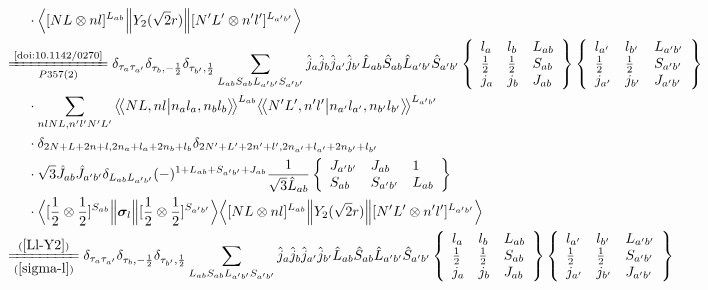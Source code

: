 \documentclass[master]{shnuthesis}
\newcommand{\llangle}{\big\langle\!\big\langle}
\newcommand{\rrangle}{\big\rangle\!\big\rangle}
\newcommand{\ap}{a^\prime}
\newcommand{\bp}{b^\prime}
\newcommand{\il}{\!\!\!\!\!\!\!\!\!\!}
\newcommand{\zdydh}{\xlongequal}
\begin{document}
\begin{align}
    & \cdot \Big\langle [N L \otimes n l]^{L_{ab}} \Big\| Y_2(\sqrt{2}r) \Big\| [N^\prime L^\prime \otimes n^\prime l^\prime]^{L_{\ap\bp}} \Big\rangle \\
    &\il \zdydh[P357(2)]{\text{\cite{doi:10.1142/0270}}} \delta_{\tau_a \tau_{\ap}}\delta_{\tau_b, -\frac{1}{2}}\delta_{\tau_{\bp}, \frac{1}{2}} \sum_{L_{ab}S_{ab}L_{\ap\bp}S_{\ap\bp}} \hat{j}_a\hat{j}_b\hat{j}_{\ap}\hat{j}_{\bp}\hat{L}_{ab}\hat{S}_{ab}\hat{L}_{\ap\bp}\hat{S}_{\ap\bp}  \left\{\begin{array}{lll}l_{a} & l_{b} & L_{ab} \\ \frac{1}{2} & \frac{1}{2} & S_{ab} \\j_{a} & j_{b} & J_{ab} \end{array}\right\} \left\{\begin{array}{lll}l_{\ap} & l_{\bp} & L_{\ap\bp} \\ \frac{1}{2} & \frac{1}{2} & S_{\ap\bp} \\j_{\ap} & j_{\bp} & J_{\ap\bp} \end{array}\right\}  \notag \\
    & \cdot \sum_{nlNL,n^\prime l^\prime N^\prime L^\prime} \llangle N L, n l \big| n_{a} l_{a}, n_{b} l_{b} \rrangle^{L_{ab}} \llangle N^\prime L^\prime, n^\prime l^\prime \big| n_{a^\prime} l_{a^\prime}, n_{b^\prime} l_{b^\prime} \rrangle^{L_{\ap\bp}} \notag\\
    & \cdot \delta_{2N+L+2n+l,2n_a+l_a+2n_b+l_b}\delta_{2N^\prime+L^\prime+2n^\prime+l^\prime,2n_{a^\prime}+l_{a^\prime}+2n_{b^\prime}+l_{b^\prime}}  \notag\\
    & \cdot \sqrt{3}\hat{J}_{ab}\hat{J}_{\ap\bp} \delta_{L_{ab}L_{\ap\bp}}(-)^{1+L_{ab}+S_{\ap\bp}+J_{ab}}\frac{1}{\sqrt{3}\hat{L}_{ab}}  \left\{\begin{array}{lll} J_{\ap\bp} & J_{ab} & 1 \\ S_{ab} & S_{\ap\bp} & L_{ab} \end{array}\right\}   \notag\\
    & \cdot \Big\langle [\frac{1}{2}\otimes\frac{1}{2}]^{S_{ab}} \Big\| \bm{\sigma}_l \Big\| [\frac{1}{2}\otimes\frac{1}{2}]^{S_{\ap\bp}} \Big\rangle \Big\langle [N L \otimes n l]^{L_{ab}} \Big\| Y_2(\sqrt{2}r) \Big\| [N^\prime L^\prime \otimes n^\prime l^\prime]^{L_{\ap\bp}} \Big\rangle \\
    &\il \zdydh[(\ref{sigma-l})]{(\ref{Ll-Y2})} \delta_{\tau_a \tau_{\ap}}\delta_{\tau_b, -\frac{1}{2}}\delta_{\tau_{\bp}, \frac{1}{2}} \sum_{L_{ab}S_{ab}L_{\ap\bp}S_{\ap\bp}} \hat{j}_a\hat{j}_b\hat{j}_{\ap}\hat{j}_{\bp}\hat{L}_{ab}\hat{S}_{ab}\hat{L}_{\ap\bp}\hat{S}_{\ap\bp}  \left\{\begin{array}{lll}l_{a} & l_{b} & L_{ab} \\ \frac{1}{2} & \frac{1}{2} & S_{ab} \\j_{a} & j_{b} & J_{ab} \end{array}\right\} \left\{\begin{array}{lll}l_{\ap} & l_{\bp} & L_{\ap\bp} \\ \frac{1}{2} & \frac{1}{2} & S_{\ap\bp} \\j_{\ap} & j_{\bp} & J_{\ap\bp} \end{array}\right\}  \notag \\

\end{align}
\end{document}
